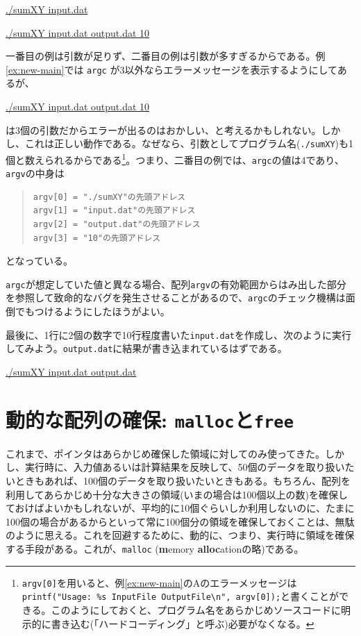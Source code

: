 \begin{commandline2}
    \prompt \underline{./sumXY input.dat}
\end{commandline2} \noindent
\begin{commandline2}
    \prompt \underline{./sumXY input.dat output.dat 10}
\end{commandline2} \noindent
一番目の例は引数が足りず、二番目の例は引数が多すぎるからである。例\ref{ex:new-main}では \texttt{argc} が3以外ならエラーメッセージを表示するようにしてあるが、
\begin{commandline2}
    \prompt \underline{./sumXY input.dat output.dat 10}
\end{commandline2} \noindent
は3個の引数だからエラーが出るのはおかしい、と考えるかもしれない。しかし、これは正しい動作である。なぜなら、引数としてプログラム名(\texttt{./sumXY})も1個と数えられるからである\footnote{\texttt{argv[0]}を用いると、例\ref{ex:new-main}のAのエラーメッセージは \texttt{printf("Usage: \%s InputFile OutputFile\textbackslash n", argv[0]);}と書くことができる。このようにしておくと、プログラム名をあらかじめソースコードに明示的に書き込む(「ハードコーディング」と呼ぶ)必要がなくなる。}。つまり、二番目の例では、\texttt{argc}の値は4であり、\texttt{argv}の中身は
\begin{quote}
    \begin{verbatim}
argv[0] = "./sumXY"の先頭アドレス
argv[1] = "input.dat"の先頭アドレス
argv[2] = "output.dat"の先頭アドレス
argv[3] = "10"の先頭アドレス
\end{verbatim}
\end{quote}
となっている。

\texttt{argc}が想定していた値と異なる場合、配列\texttt{argv}の有効範囲からはみ出した部分を参照して致命的なバグを発生させることがあるので、\texttt{argc}のチェック機構は面倒でもつけるようにしたほうがよい。

最後に、1行に2個の数字で10行程度書いた\texttt{input.dat}を作成し、次のように実行してみよう。\texttt{output.dat}に結果が書き込まれているはずである。
\begin{commandline2}
    \prompt \underline{./sumXY input.dat output.dat}
\end{commandline2}

\section{動的な配列の確保: \texttt{malloc}と\texttt{free}}
\label{sec:clang:malloc}

これまで、ポインタはあらかじめ確保した領域に対してのみ使ってきた。しかし、実行時に、入力値あるいは計算結果を反映して、50個のデータを取り扱いたいときもあれば、100個のデータを取り扱いたいときもある。もちろん、配列を利用してあらかじめ十分な大きさの領域(いまの場合は100個以上の数)を確保しておけばよいかもしれないが、平均的に10個ぐらいしか利用しないのに、たまに100個の場合があるからといって常に100個分の領域を確保しておくことは、無駄のように思える。これを回避するために、動的に、つまり、実行時に領域を確保する手段がある。これが、\texttt{malloc} (\textbf{m}emory \textbf{alloc}ationの略)である。

